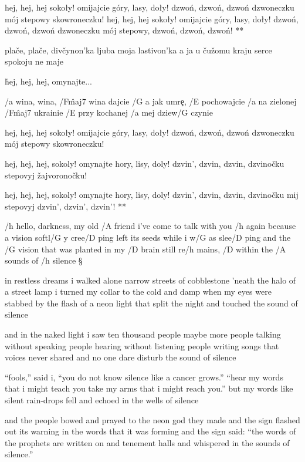 \R  hej, hej, hej sokoły!
    omijajcie góry, lasy, doły!
    dzwo\' n, dzwo\' n, dzwo\' n dzwoneczku
    mój stepowy skowroneczku! \s
    hej, hej, hej sokoły!
    omijajcie góry, lasy, doły!
    dzwo\' n, dzwo\' n, dzwo\' n dzwoneczku
    mój stepowy, dzwo\' n, dzwo\' n, dzwo\' n! ** \songgg

plače, plače, divčynon'ka
ljuba moja lastivon'ka
a ja u čužomu kraju
serce spokoju ne maje

\r hej, hej, hej, omynajte...

/a wina, wina, /F\^{maj7} wina dajcie
/G a jak umr\c e, /E pochowajcie
/a na zielonej /F\^{maj7} ukrainie
/E przy kochanej /a mej dziew/G czynie

\R  hej, hej, hej sokoły!
    omijajcie góry, lasy, doły!
    dzwo\' n, dzwo\' n, dzwo\' n dzwoneczku
    mój stepowy skowroneczku! \s

    hej, hej, hej, sokoly!
    omynajte hory, lisy, doly!
    dzvin', dzvin, dzvin, dzvinočku
    stepovyj žajvoronočku! \s

    hej, hej, hej, sokoly!
    omynajte hory, lisy, doly!
    dzvin', dzvin, dzvin, dzvinočku
    mij stepovyj dzvin', dzvin', dzvin'! **




/h hello, darkness, my old /A friend
i've come to talk with you /h again
because a vision softl/G y cree/D ping
left its seeds while i w/G as slee/D ping
and the /G vision that was planted in my /D brain
still re/h mains, /D within the /A sounds of /h silence \S

in restless dreams i walked alone
narrow streets of cobblestone
'neath the halo of a street lamp
i turned my collar to the cold and damp
when my eyes were stabbed by the flash of a neon light
that split the night and touched the sound of silence \s

and in the naked light i saw
ten thousand people maybe more
people talking without speaking
people hearing without listening
people writing songs that voices never shared
and no one dare disturb the sound of silence \s

``fools,'' said i, ``you do not know
silence like a cancer grows.''
``hear my words that i might teach you
take my arms that i might reach you.''
but my words like silent rain-drops fell
and echoed in the wells of silence \s

and the people bowed and prayed
to the neon god they made
and the sign flashed out its warning
in the words that it was forming
and the sign said: ``the words of the prophets are written on 
and tenement halls
and whispered in the sounds of silence.''



